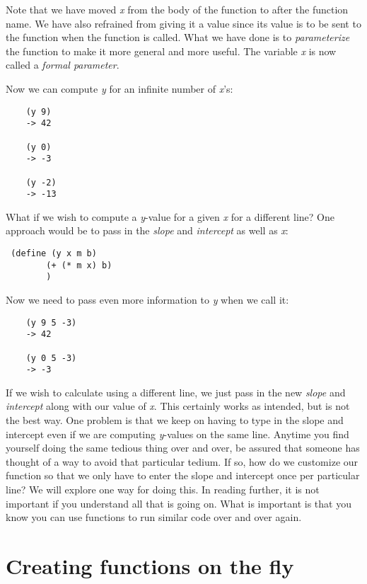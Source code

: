Note that we have moved {\it x} from the body of the function
to after the function name. We have also refrained from
giving it a value since its value is to be sent to the function
when the function is called.
What we have done is to {\it parameterize} the function to make it more
general and more useful. The variable {\it x} is now called a
{\it formal parameter}.

Now we can compute {\it y} for an infinite number of {\it x}'s:

\begin{verbatim}
    (y 9)
    -> 42
    
    (y 0)
    -> -3
    
    (y -2)
    -> -13
\end{verbatim}

What if we wish to
compute a {\it y}-value for a given {\it x} for a different
line? One approach would be to pass in the {\it slope} and {\it intercept}
as well as {\it x}:

\begin{verbatim}
 (define (y x m b)
        (+ (* m x) b)
        )
\end{verbatim}

Now we need to pass even more information to {\it y} when we call it:
    
\begin{verbatim}
    (y 9 5 -3)
    -> 42
     
    (y 0 5 -3)
    -> -3
\end{verbatim}

If we wish to calculate using a different line, we just pass in the
new {\it slope} and {\it intercept} along with our value of {\it x}.
This certainly works as intended, but is not the best way. One problem
is that we keep on having to type in the slope and intercept even if
we are computing {\it y}-values on the same line. Anytime you
find yourself doing the same tedious thing over and over,
be assured that
someone has thought of a way to avoid that particular tedium.
If so, how do we
customize our function so that we only have to enter the slope
and intercept once per particular line? We will explore
one way for doing this. In reading further,
it is not important if you understand all that is going on.
What is important is that you know you can use functions
to run similar code over and over again.

\section{Creating functions on the fly}

